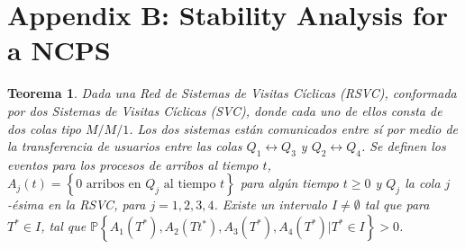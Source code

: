 \documentclass{article}
\newtheorem{Teo}{Teorema}
\newcommand{\prob}{\mathbb{P}}
\begin{document}
\section{Appendix B: Stability Analysis for a NCPS}
%
\begin{Teo}
Dada una Red de Sistemas de Visitas C\'iclicas (RSVC), conformada por dos Sistemas de Visitas C\'iclicas (SVC), donde cada uno de ellos consta de dos colas tipo $M/M/1$. Los dos sistemas est\'an comunicados entre s\'i por medio de la transferencia de usuarios entre las colas $Q_{1}\leftrightarrow Q_{3}$ y $Q_{2}\leftrightarrow Q_{4}$. Se definen los eventos para los procesos de arribos al tiempo $t$, $A_{j}\left(t\right)=\left\{0 \textrm{ arribos en }Q_{j}\textrm{ al tiempo }t\right\}$ para alg\'un tiempo $t\geq0$ y $Q_{j}$ la cola $j$-\'esima en la RSVC, para $j=1,2,3,4$.  Existe un intervalo $I\neq\emptyset$ tal que para $T^{*}\in I$, tal que $\prob\left\{A_{1}\left(T^{*}\right),A_{2}\left(Tt^{*}\right),
A_{3}\left(T^{*}\right),A_{4}\left(T^{*}\right)|T^{*}\in I\right\}>0$.
\end{Teo}
\end{document}
